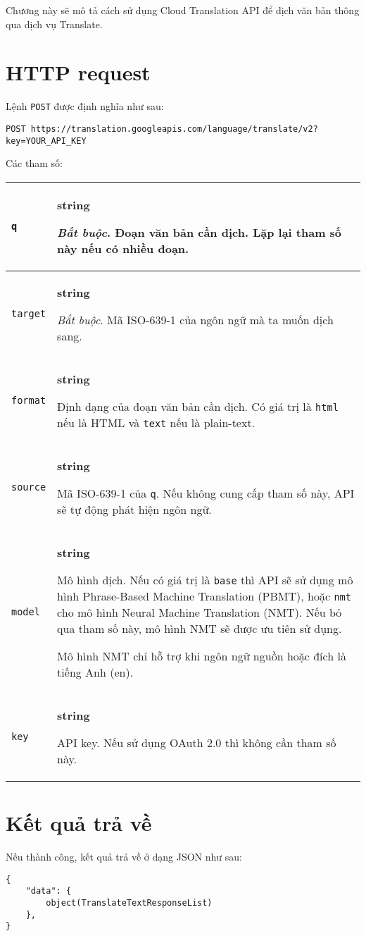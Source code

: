 \documentclass[../thesis.tex]{subfiles}
\begin{document}
Chương này sẽ mô tả cách sử dụng Cloud Translation API để dịch văn bản thông qua dịch vụ Translate.

\section{HTTP request}

Lệnh \lstinline{POST} được định nghĩa như sau:

\begin{lstlisting}[style=link]
POST https://translation.googleapis.com/language/translate/v2?key=YOUR_API_KEY
\end{lstlisting}

Các tham số:

\begin{center}
\begin{tabularx}{\textwidth}{|p{}|X|}
\hline
\lstinline{q} & \textbf{string}

\textit{Bắt buộc}. Đoạn văn bản cần dịch. Lặp lại tham số này nếu có nhiều đoạn.\\
\hline
\lstinline{target} & \textbf{string}

\textit{Bắt buộc}. Mã ISO-639-1 của ngôn ngữ mà ta muốn dịch sang.\\
\hline
\lstinline{format} & \textbf{string}

Định dạng của đoạn văn bản cần dịch. Có giá trị là \lstinline{html} nếu là HTML và \lstinline{text} nếu là plain-text.\\
\hline
\lstinline{source} & \textbf{string}

Mã ISO-639-1 của \lstinline{q}. Nếu không cung cấp tham số này, API sẽ tự động phát hiện ngôn ngữ.\\
\hline
\lstinline{model} & \textbf{string}

Mô hình dịch. Nếu có giá trị là \lstinline{base} thì API sẽ sử dụng mô hình Phrase-Based Machine Translation (PBMT), hoặc \lstinline{nmt} cho mô hình Neural Machine Translation (NMT). Nếu bỏ qua tham số này, mô hình NMT sẽ được ưu tiên sử dụng.

Mô hình NMT chỉ hỗ trợ khi ngôn ngữ nguồn hoặc đích là tiếng Anh (en).\\
\hline
\lstinline{key} & \textbf{string}

API key. Nếu sử dụng OAuth 2.0 thì không cần tham số này.\\
\hline
\end{tabularx}
\end{center}

\section{Kết quả trả về}
Nếu thành công, kết quả trả về ở dạng JSON như sau:
\begin{lstlisting}[style=link]
{
	"data": {
		object(TranslateTextResponseList)
	},
}
\end{lstlisting}
\end{document}
